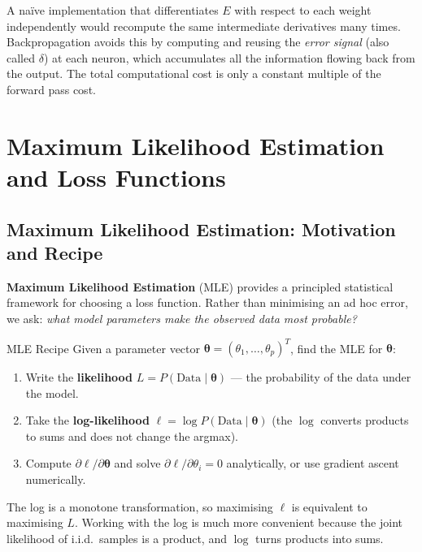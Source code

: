 \documentclass[11pt,a4paper]{article}
\newcommand{\term}[1]{\textcolor{DefGreen}{\textbf{#1}}}
\begin{document}
\begin{insightbox}
A naïve implementation that differentiates $E$ with respect to each weight independently would recompute the same intermediate derivatives many times. Backpropagation avoids this by computing and reusing the \emph{error signal} (also called $\delta$) at each neuron, which accumulates all the information flowing back from the output. The total computational cost is only a constant multiple of the forward pass cost.
\end{insightbox}

\section{Maximum Likelihood Estimation and Loss Functions}

\subsection{Maximum Likelihood Estimation: Motivation and Recipe}

\term{Maximum Likelihood Estimation} (MLE) provides a principled statistical framework for choosing a loss function. Rather than minimising an ad hoc error, we ask: \emph{what model parameters make the observed data most probable?}

\begin{defbox}{MLE Recipe}
Given a parameter vector $\boldsymbol{\theta} = (\theta_1, \ldots, \theta_p)^T$, find the MLE for $\boldsymbol{\theta}$:
\begin{enumerate}
  \item Write the \textbf{likelihood} $L = P(\text{Data} \mid \boldsymbol{\theta})$ — the probability of the data under the model.
  \item Take the \textbf{log-likelihood} $\ell = \log P(\text{Data} \mid \boldsymbol{\theta})$ (the $\log$ converts products to sums and does not change the argmax).
  \item Compute $\partial \ell / \partial \boldsymbol{\theta}$ and solve $\partial \ell / \partial \theta_i = 0$ analytically, or use gradient ascent numerically.
\end{enumerate}
\end{defbox}

The log is a monotone transformation, so maximising $\ell$ is equivalent to maximising $L$. Working with the log is much more convenient because the joint likelihood of i.i.d.\ samples is a product, and $\log$ turns products into sums.
\end{document}

